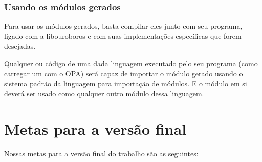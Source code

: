 \subsubsection{Usando os módulos gerados}
Para usar os módulos gerados, basta compilar eles junto com seu programa, ligado com
a libouroboros e com suas implementações específicas que forem desejadas.

Qualquer \script{} ou código de uma dada linguagem executado pelo seu programa (como 
carregar um \script{} com o OPA) será capaz de importar o módulo gerado usando o
sistema padrão da linguagem para importação de módulos. E o módulo em si deverá ser
usado como qualquer outro módulo dessa linguagem.

\section{Metas para a versão final}
\label{sec:resultados:pendencias}
Nossas metas para a versão final do trabalho são as seguintes:

